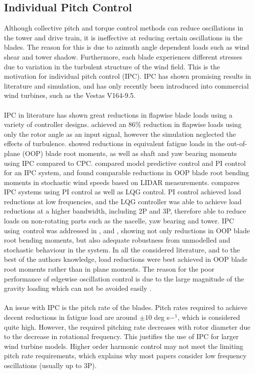 \subsection{Individual Pitch Control}
Although collective pitch and torque control methods can reduce oscillations in the tower and drive train, it is ineffective at reducing certain oscillations in the blades. The reason for this is due to azimuth angle dependent loads such as wind shear and tower shadow. Furthermore, each blade experiences different stresses due to variation in the turbulent structure of the wind field. This is the motivation for individual pitch control (IPC). IPC has shown promising results in literature and simulation, and has only recently been introduced into commercial wind turbines, such as the Vestas V164-9.5.
\\~\\
IPC in literature has shown great reductions in flapwise blade loads using a variety of controller designs. \citet{4_trudnowski} achieved an 86\% reduction in flapwise loads using only the rotor angle as an input signal, however the simulation neglected the effects of turbulence. \citet{5_Bossanyi} showed reductions in equivalent fatigue loads in the out-of-plane (OOP) blade root moments, as well as shaft and yaw bearing moments using IPC compared to CPC. \citet{6_Mirzaei} compared model predictive control and PI control for an IPC system, and found comparable reductions in OOP blade root bending moments in stochastic wind speeds based on LIDAR measurements. \citet{14_Selvam} compares IPC systems using PI control as well as LQG control. PI control achieved load reductions at low frequencies, and the LQG controller was able to achieve load reductions at a higher bandwidth, including 2P and 3P, therefore able to reduce loads on non-rotating parts such as the nacelle, yaw bearing and tower. IPC using~\hinfty control was addressed in \citet{1_Lu}, \citet{2_Kanev} and \citet{17_Geyler}, showing not only reductions in OOP blade root bending moments, but also adequate robustness from unmodelled and stochastic behaviour in the system. In all the considered literature, and to the best of the authors knowledge, load reductions were best achieved in OOP blade root moments rather than in plane moments. The reason for the poor performance of edgewise oscillation control is due to the large magnitude of the gravity loading which can not be avoided easily \cite{4_trudnowski}.
\\~\\
An issue with IPC is the pitch rate of the blades. Pitch rates required to achieve decent reductions in fatigue load are around $\pm10$ deg s$-^1$, which is considered quite high\cite{15_bossanyi}. However, the required pitching rate decreases with rotor diameter due to the decrease in rotational frequency. This justifies the use of IPC for larger wind turbine models. Higher order harmonic control may not meet the limiting pitch rate requirements, which explains why most papers consider low frequency oscillations (usually up to 3P). \cite{17_Geyler}
